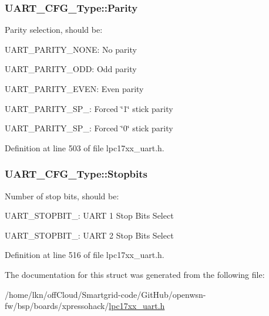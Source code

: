 \subsubsection[{\texorpdfstring{Parity}{Parity}}]{ U\+A\+R\+T\+\_\+\+C\+F\+G\+\_\+\+Type\+::\+Parity}\hypertarget{struct_u_a_r_t___c_f_g___type_aabca9f673560eb77a5c3136e766c55e4}{}\label{struct_u_a_r_t___c_f_g___type_aabca9f673560eb77a5c3136e766c55e4}
Parity selection, should be\+:
\begin{DoxyItemize}
\item U\+A\+R\+T\+\_\+\+P\+A\+R\+I\+T\+Y\+\_\+\+N\+O\+NE\+: No parity
\item U\+A\+R\+T\+\_\+\+P\+A\+R\+I\+T\+Y\+\_\+\+O\+DD\+: Odd parity
\item U\+A\+R\+T\+\_\+\+P\+A\+R\+I\+T\+Y\+\_\+\+E\+V\+EN\+: Even parity
\item U\+A\+R\+T\+\_\+\+P\+A\+R\+I\+T\+Y\+\_\+\+S\+P\+\_\+: Forced \char`\"{}1\char`\"{} stick parity
\item U\+A\+R\+T\+\_\+\+P\+A\+R\+I\+T\+Y\+\_\+\+S\+P\+\_\+: Forced \char`\"{}0\char`\"{} stick parity 
\end{DoxyItemize}

Definition at line 503 of file lpc17xx\+\_\+uart.\+h.

\subsubsection[{\texorpdfstring{Stopbits}{Stopbits}}]{ U\+A\+R\+T\+\_\+\+C\+F\+G\+\_\+\+Type\+::\+Stopbits}\hypertarget{struct_u_a_r_t___c_f_g___type_afbf7b4f60c9d420b2bb41b58bb0212f6}{}\label{struct_u_a_r_t___c_f_g___type_afbf7b4f60c9d420b2bb41b58bb0212f6}
Number of stop bits, should be\+:
\begin{DoxyItemize}
\item U\+A\+R\+T\+\_\+\+S\+T\+O\+P\+B\+I\+T\+\_\+: U\+A\+RT 1 Stop Bits Select
\item U\+A\+R\+T\+\_\+\+S\+T\+O\+P\+B\+I\+T\+\_\+: U\+A\+RT 2 Stop Bits Select 
\end{DoxyItemize}

Definition at line 516 of file lpc17xx\+\_\+uart.\+h.



The documentation for this struct was generated from the following file\+:\begin{DoxyCompactItemize}
\item 
/home/lkn/off\+Cloud/\+Smartgrid-\/code/\+Git\+Hub/openwsn-\/fw/bsp/boards/xpressohack/\hyperlink{lpc17xx__uart_8h}{lpc17xx\+\_\+uart.\+h}\end{DoxyCompactItemize}
